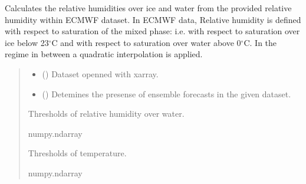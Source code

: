 \documentclass[a4paper,11pt,english]{sphinxmanual}
\begin{document}
\begin{fulllineitems}
\label{\detokenize{modules:envlib.contrail.get_relative_hum}}
\pysigstartsignatures
{}
\pysigstopsignatures
\sphinxAtStartPar
Calculates the relative humidities over ice and water from the provided relative humidity within ECMWF
dataset. In ECMWF data, Relative humidity is defined with respect to saturation of the mixed phase: i.e. with
respect to saturation over ice below \sphinxhyphen{}23$^{\circ}$C and with respect to saturation over water above 0$^{\circ}$C. In the regime in
between a quadratic interpolation is applied.
\begin{quote}\begin{description}
\begin{itemize}
\item {} 
\sphinxAtStartPar
{} () \textendash{} Dataset openned with xarray.

\item {} 
\sphinxAtStartPar
{} () \textendash{} Detemines the presense of ensemble forecasts in the given dataset.

\end{itemize}

\sphinxAtStartPar
Thresholds of relative humidity over water.

\sphinxAtStartPar
numpy.ndarray

\sphinxAtStartPar
Thresholds of temperature.

\sphinxAtStartPar
numpy.ndarray

\end{description}\end{quote}

\end{fulllineitems}

\end{document}
